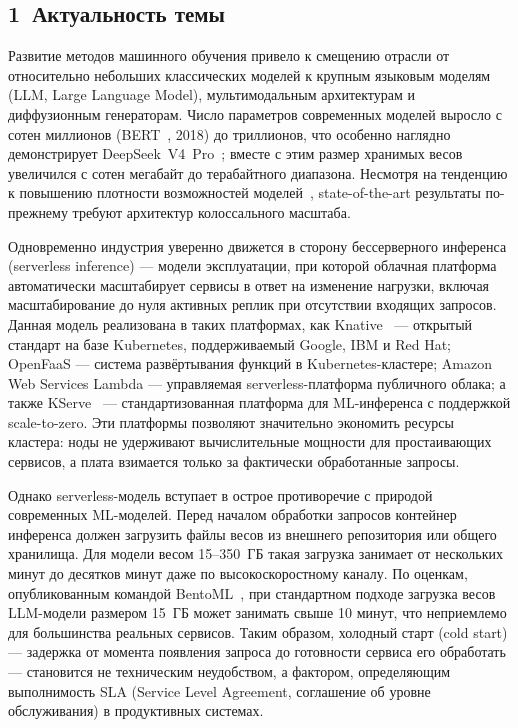 \introduction

\subsection*{1~Актуальность темы}

Развитие методов машинного обучения привело к смещению отрасли от относительно небольших классических моделей к крупным языковым моделям (LLM, Large Language Model), мультимодальным архитектурам и диффузионным генераторам. Число параметров современных моделей выросло с сотен миллионов (BERT~\cite{bert2018}, 2018) до триллионов, что особенно наглядно демонстрирует DeepSeek~V4~Pro~\cite{deepseekv4_2026}; вместе с этим размер хранимых весов увеличился с сотен мегабайт до терабайтного диапазона. Несмотря на тенденцию к повышению плотности возможностей моделей~\cite{capability_density}, state-of-the-art результаты по-прежнему требуют архитектур колоссального масштаба.

Одновременно индустрия уверенно движется в сторону бессерверного инференса (serverless inference) --- модели эксплуатации, при которой облачная платформа автоматически масштабирует сервисы в ответ на изменение нагрузки, включая масштабирование до нуля активных реплик при отсутствии входящих запросов. Данная модель реализована в таких платформах, как Knative~\cite{knative} --- открытый стандарт на базе Kubernetes, поддерживаемый Google, IBM и Red Hat; OpenFaaS --- система развёртывания функций в Kubernetes-кластере; Amazon Web Services Lambda --- управляемая serverless-платформа публичного облака; а также KServe~\cite{kserve} --- стандартизованная платформа для ML-инференса с поддержкой scale-to-zero. Эти платформы позволяют значительно экономить ресурсы кластера: ноды не удерживают вычислительные мощности для простаивающих сервисов, а плата взимается только за фактически обработанные запросы.

Однако serverless-модель вступает в острое противоречие с природой современных ML-моделей. Перед началом обработки запросов контейнер инференса должен загрузить файлы весов из внешнего репозитория или общего хранилища. Для модели весом 15--350~ГБ такая загрузка занимает от нескольких минут до десятков минут даже по высокоскоростному каналу. По оценкам, опубликованным командой BentoML~\cite{bentoml2024cold}, при стандартном подходе загрузка весов LLM-модели размером 15~ГБ может занимать свыше 10 минут, что неприемлемо для большинства реальных сервисов. Таким образом, холодный старт (cold start) --- задержка от момента появления запроса до готовности сервиса его обработать --- становится не техническим неудобством, а фактором, определяющим выполнимость SLA (Service Level Agreement, соглашение об уровне обслуживания) в продуктивных системах.

